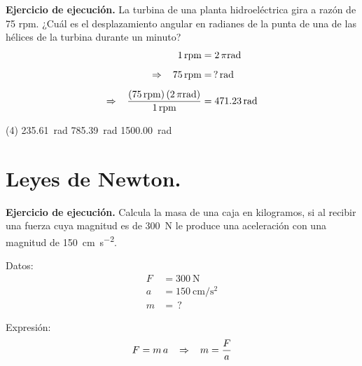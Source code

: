 \documentclass[12pt, letter]{exam}
\begin{document}
\begin{questions}
    \setcounter{question}{12} \question \label{Ejercicio_07} \textbf{Ejercicio de ejecución. } La turbina de una planta hidroeléctrica gira a razón de 75 rpm. ¿Cuál es el desplazamiento angular en radianes de la punta de una de las hélices de la turbina durante un minuto?
    \begin{align*}
        1 \, \text{rpm} &= 2 \, \pi \unit{\radian} \\[0.5em]
        \Rightarrow \hspace{0.3cm} 75 \, \text{rpm} &= \, ? \, \unit{\radian} \\[0.5em]
        \Rightarrow \hspace{0.3cm} \dfrac{\left( 75 \, \text{rpm} \right) (2 \, \pi \unit{\radian})}{1 \, \text{rpm}} &= \SI{471.23}{\radian}
    \end{align*}
    \begin{tasks}(4)
        \task \SI{235.61}{\radian}
        \task {}
        \task \SI{785.39}{\radian}
        \task \SI{1500.00}{\radian}
    \end{tasks}
    
    \section{Leyes de Newton.}

    \setcounter{question}{15} \question \label{Ejercicio_10} \textbf{Ejercicio de ejecución. } Calcula la masa de una caja en kilogramos, si al recibir una fuerza cuya magnitud es de \SI{300}{\newton} le produce una aceleración con una magnitud de \SI{150}{\centi\meter\per\square\second}.
    
    \begin{minipage}[t]{0.35\linewidth}
    Datos: 
    \begin{align*}
    F &= \SI{300}{\newton} \\
    a &= \SI{150}{\centi\meter\per\square\second} \\
    m &= \, ?
    \end{align*}
    \end{minipage}
    \hspace{1cm}
    \begin{minipage}[t]{0.4\linewidth}
    Expresión:
    \begin{align*}
    F = m \, a \hspace{0.3cm} \Rightarrow \hspace{0.3cm} m = \dfrac{F}{a}
    \end{align*}
    \end{minipage}


\end{questions}
\end{document}
